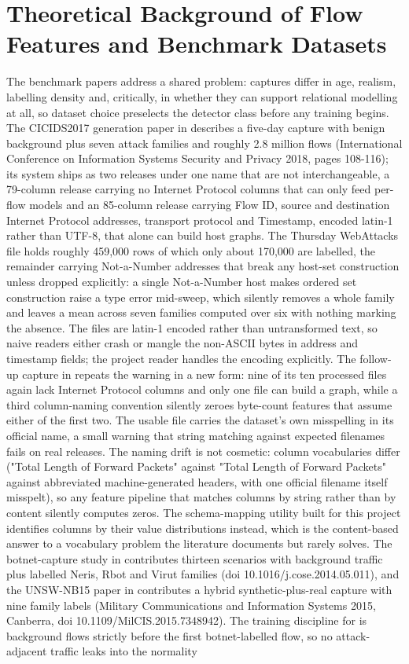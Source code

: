 \section{Theoretical Background of Flow Features and Benchmark Datasets}

The benchmark papers address a shared problem: captures differ in age, realism, labelling density and, critically, in whether they can support relational modelling at all, so dataset choice preselects the detector class before any training begins. The CICIDS2017 generation paper in \cite{k5} describes a five-day capture with benign background plus seven attack families and roughly 2.8 million flows (International Conference on Information Systems Security and Privacy 2018, pages 108-116); its system ships as two releases under one name that are not interchangeable, a 79-column release carrying no Internet Protocol columns that can only feed per-flow models and an 85-column release carrying Flow ID, source and destination Internet Protocol addresses, transport protocol and Timestamp, encoded latin-1 rather than UTF-8, that alone can build host graphs. The Thursday WebAttacks file holds roughly 459,000 rows of which only about 170,000 are labelled, the remainder carrying Not-a-Number addresses that break any host-set construction unless dropped explicitly: a single Not-a-Number host makes ordered set construction raise a type error mid-sweep, which silently removes a whole family and leaves a mean across seven families computed over six with nothing marking the absence. The files are latin-1 encoded rather than untransformed text, so naive readers either crash or mangle the non-ASCII bytes in address and timestamp fields; the project reader handles the encoding explicitly. The follow-up capture in \cite{k6} repeats the warning in a new form: nine of its ten processed files again lack Internet Protocol columns and only one file can build a graph, while a third column-naming convention silently zeroes byte-count features that assume either of the first two. The usable file carries the dataset's own misspelling in its official name, a small warning that string matching against expected filenames fails on real releases. The naming drift is not cosmetic: column vocabularies differ ("Total Length of Forward Packets" against "Total Length of Forward Packets" against abbreviated machine-generated headers, with one official filename itself misspelt), so any feature pipeline that matches columns by string rather than by content silently computes zeros. The schema-mapping utility built for this project identifies columns by their value distributions instead, which is the content-based answer to a vocabulary problem the literature documents but rarely solves. The botnet-capture study in \cite{k7} contributes thirteen scenarios with background traffic plus labelled Neris, Rbot and Virut families (doi 10.1016/j.cose.2014.05.011), and the UNSW-NB15 paper in \cite{k8} contributes a hybrid synthetic-plus-real capture with nine family labels (Military Communications and Information Systems 2015, Canberra, doi 10.1109/MilCIS.2015.7348942). The training discipline for \cite{k7} is background flows strictly before the first botnet-labelled flow, so no attack-adjacent traffic leaks into the normality 